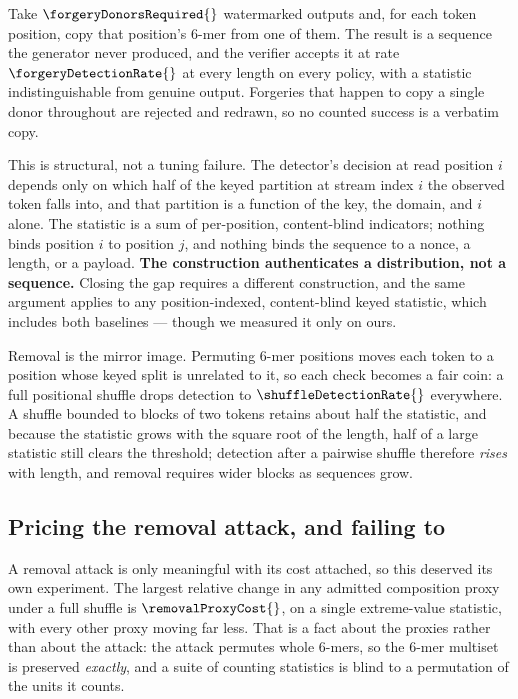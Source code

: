 Take $\forgeryDonorsRequired{}$ watermarked outputs and, for each token position, copy that position's
6-mer from one of them. The result is a sequence the generator never produced, and the verifier accepts
it at rate $\forgeryDetectionRate{}$ at every length on every policy, with a statistic
indistinguishable from genuine output. Forgeries that happen to copy a single donor throughout are
rejected and redrawn, so no counted success is a verbatim copy.

This is structural, not a tuning failure. The detector's decision at read position $i$ depends only on
which half of the keyed partition at stream index $i$ the observed token falls into, and that partition
is a function of the key, the domain, and $i$ alone. The statistic is a sum of per-position,
content-blind indicators; nothing binds position $i$ to position $j$, and nothing binds the sequence to
a nonce, a length, or a payload. \textbf{The construction authenticates a distribution, not a
sequence.} Closing the gap requires a different construction, and the same argument applies to any
position-indexed, content-blind keyed statistic, which includes both baselines --- though we measured
it only on ours.

Removal is the mirror image. Permuting 6-mer positions moves each token to a position whose keyed split
is unrelated to it, so each check becomes a fair coin: a full positional shuffle drops detection to
$\shuffleDetectionRate{}$ everywhere. A shuffle bounded to blocks of two tokens retains about half the
statistic, and because the statistic grows with the square root of the length, half of a large statistic
still clears the threshold; detection after a pairwise shuffle therefore \emph{rises} with length, and
removal requires wider blocks as sequences grow.



\subsection{Pricing the removal attack, and failing to}

A removal attack is only meaningful with its cost attached, so this deserved its own experiment. The
largest relative change in any admitted composition proxy under a full shuffle is
$\removalProxyCost{}$, on a single extreme-value statistic, with every other proxy moving far less.
That is a fact about the proxies rather than about the attack: the attack permutes whole 6-mers, so the
6-mer multiset is preserved \emph{exactly}, and a suite of counting statistics is blind to a
permutation of the units it counts.

